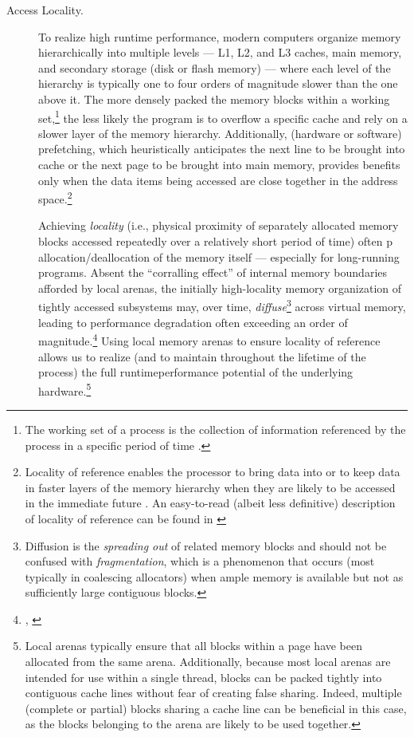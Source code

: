 \begin{description}
\item[Access Locality.] To realize high runtime performance, modern computers
organize memory hierarchically into multiple levels — L1, L2, and L3 caches,
main memory, and secondary storage (disk or flash memory) — where each
level of the hierarchy is typically one to four orders of magnitude slower than
the one above it. The more densely packed the memory blocks within a
working set,\footnote{The working set of a process is the collection of information referenced by the process in a specific
period of time \cite{denning68}.} the less likely the program is to overflow a specific cache and
rely on a slower layer of the memory hierarchy. Additionally, (hardware or
software) prefetching, which heuristically anticipates the next line to be
brought into cache or the next page to be brought into main memory, provides
benefits only when the data items being accessed are close together in the
address space.\footnote{Locality of reference \cite{denning05} enables the processor to bring data into or to keep data in faster
layers of the memory hierarchy when they are likely to be accessed in the immediate future
\cite{stallings10}. An easy-to-read (albeit less definitive) description of locality of reference can be found
in \cite{wikipedia19}}

Achieving \emph{locality} (i.e., physical proximity of separately allocated memory
blocks accessed repeatedly over a relatively short period of time) often p
allocation/deallocation of the memory itself — especially for long-running
programs. Absent the “corralling effect” of internal memory boundaries
afforded by local arenas, the initially high-locality memory organization of
tightly accessed subsystems may, over time, \emph{diffuse}\footnote{Diffusion is the \emph{spreading out} of related memory blocks and should not be confused with
\emph{fragmentation}, which is a phenomenon that occurs (most typically in coalescing allocators) when
ample memory is available but not as sufficiently large contiguous blocks.} across virtual memory,
leading to performance degradation often exceeding an order of magnitude.\footnote{\cite{bleney16}, \cite{lakos16}}
Using local memory arenas to ensure locality of reference allows us to realize
(and to maintain throughout the lifetime of the process) the full runtimeperformance potential of the underlying
hardware.\footnote{Local arenas typically ensure that all blocks within a page have been allocated from the same
arena. Additionally, because most local arenas are intended for use within a single thread, blocks can
be packed tightly into contiguous cache lines without fear of creating false sharing. Indeed, multiple
(complete or partial) blocks sharing a cache line can be beneficial in this case, as the blocks
belonging to the arena are likely to be used together.}


\end{description}
